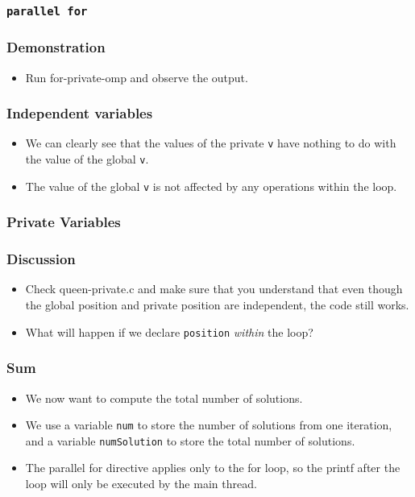 \documentclass{beamer}
\begin{document}
\begin{frame}
\frametitle{\tt parallel for} 
\end{frame}

\begin{frame}
\frametitle{Demonstration}
\begin{itemize}
\item Run for-private-omp and observe the output.
\end{itemize}
\end{frame}

\begin{frame}
\frametitle{Independent variables}
\begin{itemize}
\item We can clearly see that the values of the private {\tt v} have
  nothing to do with the value of the global {\tt v}.
\item The value of the global {\tt v} is not affected by any
  operations within the loop.
\end{itemize}
\end{frame}

\begin{frame}
\frametitle{Private Variables}
\centerline{}
\end{frame}

\begin{frame}
\frametitle{Discussion}
\begin{itemize}
\item Check queen-private.c and make sure that you understand that
  even though the global position and private position are
  independent, the code still works.
\item What will happen if we declare {\tt position} {\em within} the
  loop?
\end{itemize}
\end{frame}



\begin{frame}
\frametitle{Sum}
\begin{itemize}
\item We now want to compute the total number of solutions.
\item We use a variable {\tt num} to store the number of solutions
  from one iteration, and a variable {\tt numSolution} to store the
  total number of solutions.
\item The parallel for directive applies only to the for loop, so the
  printf after the loop will only be executed by the main thread.
\end{itemize}
\end{frame}
\end{document}
